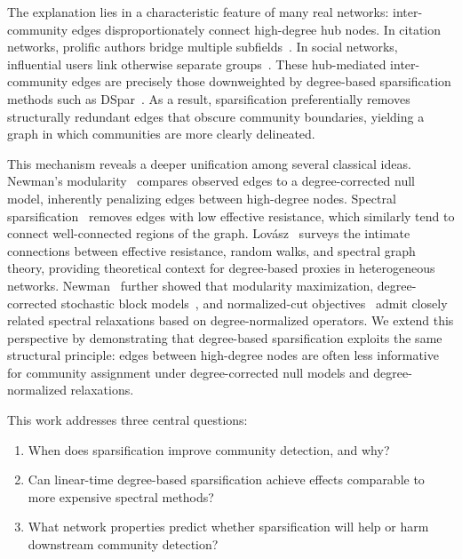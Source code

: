 \documentclass[10pt,journal,compsoc]{IEEEtran}
\begin{document}
The explanation lies in a characteristic feature of many real networks: inter-community edges disproportionately connect high-degree hub nodes.
In citation networks, prolific authors bridge multiple subfields~\cite{newman2001structure}.
In social networks, influential users link otherwise separate groups~\cite{granovetter1973strength}.
These hub-mediated inter-community edges are precisely those downweighted by degree-based sparsification methods such as DSpar~\cite{liu2023dspar}.
As a result, sparsification preferentially removes structurally redundant edges that obscure community boundaries, yielding a graph in which communities are more clearly delineated.

This mechanism reveals a deeper unification among several classical ideas.
Newman's modularity~\cite{newman2006modularity} compares observed edges to a degree-corrected null model, inherently penalizing edges between high-degree nodes.
Spectral sparsification~\cite{spielman2008graph} removes edges with low effective resistance, which similarly tend to connect well-connected regions of the graph.
Lov\'{a}sz~\cite{lovasz1993random} surveys the intimate connections between effective resistance, random walks, and spectral graph theory, providing theoretical context for degree-based proxies in heterogeneous networks.
Newman~\cite{newman2013spectral} further showed that modularity maximization, degree-corrected stochastic block models~\cite{karrer2011stochastic}, and normalized-cut objectives~\cite{shi2000normalized} admit closely related spectral relaxations based on degree-normalized operators.
We extend this perspective by demonstrating that degree-based sparsification exploits the same structural principle: edges between high-degree nodes are often less informative for community assignment under degree-corrected null models and degree-normalized relaxations.

This work addresses three central questions:

\begin{enumerate}
    \item When does sparsification improve community detection, and why?
    \item Can linear-time degree-based sparsification achieve effects comparable to more expensive spectral methods?
    \item What network properties predict whether sparsification will help or harm downstream community detection?
\end{enumerate}
\end{document}
